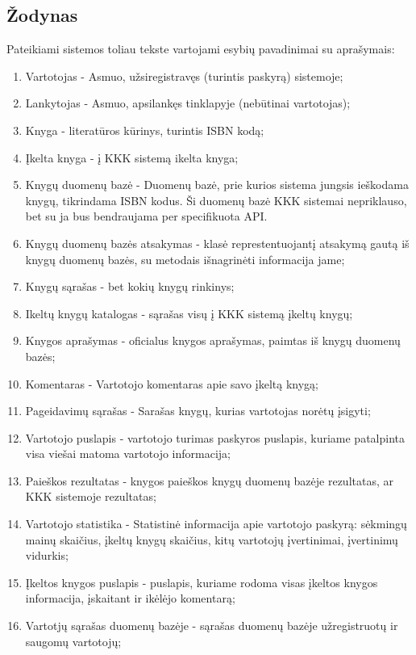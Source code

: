\documentclass{VUMIFPSkursinis}
\begin{document}
	\subsection{Žodynas}
		Pateikiami sistemos toliau tekste vartojami esybių pavadinimai su aprašymais:
		\begin{enumerate}[label=\textbf{E\arabic*.}]
			\item Vartotojas - Asmuo, užsiregistravęs (turintis paskyrą) sistemoje;
			\item Lankytojas - Asmuo, apsilankęs tinklapyje (nebūtinai vartotojas);
			\item Knyga - literatūros kūrinys, turintis ISBN kodą;
			\item Įkelta knyga - į KKK sistemą ikelta knyga;
			\item Knygų duomenų bazė - Duomenų bazė, prie kurios sistema jungsis ieškodama knygų, tikrindama ISBN kodus. 
				Ši duomenų bazė KKK sistemai nepriklauso, bet su ja bus bendraujama per specifikuota API.
			\item Knygų duomenų bazės atsakymas - klasė represtentuojantį atsakymą gautą iš knygų duomenų bazės,
				su metodais išnagrinėti informacija jame;
			\item Knygų sąrašas - bet kokių knygų rinkinys;
			\item Ikeltų knygų katalogas - sąrašas visų į KKK sistemą įkeltų knygų;
			\item Knygos aprašymas - oficialus knygos aprašymas, paimtas iš knygų duomenų bazės;
			\item Komentaras - Vartotojo komentaras apie savo įkeltą knygą;
			\item Pageidavimų sąrašas - Sarašas knygų, kurias vartotojas norėtų įsigyti;
			\item Vartotojo puslapis - vartotojo turimas paskyros puslapis, kuriame patalpinta visa viešai matoma vartotojo informacija;
			\item Paieškos rezultatas - knygos paieškos knygų duomenų bazėje rezultatas, ar KKK sistemoje rezultatas;
			\item Vartotojo statistika - Statistinė informacija apie vartotojo paskyrą: sėkmingų mainų skaičius, įkeltų knygų skaičius,
				kitų vartotojų įvertinimai, įvertinimų vidurkis;
			\item Įkeltos knygos puslapis - puslapis, kuriame rodoma visas įkeltos knygos informacija, įskaitant ir ikėlėjo komentarą;
			\item Vartotjų sąrašas duomenų bazėje - sąrašas duomenų bazėje užregistruotų ir saugomų vartotojų;
		\end{enumerate}
\end{document}
